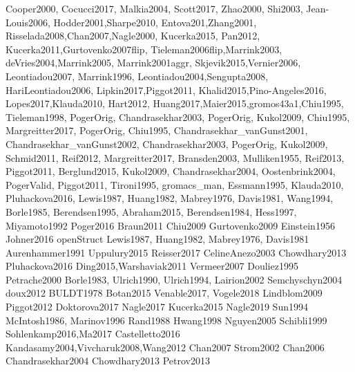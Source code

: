 Cooper2000, Cocucci2017, Malkia2004, Scott2017, Zhao2000, Shi2003, Jean-Louis2006, Hodder2001,Sharpe2010, Entova201,Zhang2001, Risselada2008,Chan2007,Nagle2000, Kucerka2015, Pan2012, Kucerka2011,Gurtovenko2007flip, Tieleman2006flip,Marrink2003, deVries2004,Marrink2005, Marrink2001aggr, Skjevik2015,Vernier2006, Leontiadou2007, Marrink1996, Leontiadou2004,Sengupta2008, HariLeontiadou2006, Lipkin2017,Piggot2011, Khalid2015,Pino-Angeles2016, Lopes2017,Klauda2010, Hart2012, Huang2017,Maier2015,gromos43a1,Chiu1995, Tieleman1998, PogerOrig, Chandrasekhar2003, PogerOrig, Kukol2009, Chiu1995, Margreitter2017, PogerOrig, Chiu1995, Chandrasekhar_vanGunst2001, Chandrasekhar_vanGunst2002, Chandrasekhar2003, PogerOrig, Kukol2009, Schmid2011, Reif2012, Margreitter2017, Bransden2003, Mulliken1955, Reif2013, Piggot2011, Berglund2015, Kukol2009, Chandrasekhar2004, Oostenbrink2004, PogerValid, Piggot2011, Tironi1995, gromacs_man, Essmann1995, Klauda2010, Pluhackova2016, Lewis1987, Huang1982, Mabrey1976, Davis1981, Wang1994, Borle1985, Berendsen1995, Abraham2015, Berendsen1984, Hess1997, Miyamoto1992
Poger2016
Braun2011
Chiu2009
Gurtovenko2009
Einstein1956
Johner2016
openStruct
Lewis1987, Huang1982, Mabrey1976, Davis1981
Aurenhammer1991
Uppulury2015
Reisser2017
CelineAnezo2003
Chowdhary2013
Pluhackova2016
Ding2015,Warshaviak2011
Vermeer2007
Douliez1995
Petrache2000
Borle1983, Ulrich1990, Ulrich1994, Lairion2002
Semchyschyn2004
doux2012
BULDT1978
Botan2015
Venable2017, Vogele2018
Lindblom2009
Piggot2012
Doktorova2017
Nagle2017
Kucerka2015
Nagle2019
Sun1994
McIntosh1986, Marinov1996
Rand1988
Hwang1998
Nguyen2005
Schibli1999
Sohlenkamp2016,Ma2017
Castelletto2016
Kandasamy2004,Vivcharuk2008,Wang2012
Chan2007
Strom2002
Chan2006
Chandrasekhar2004
Chowdhary2013
Petrov2013